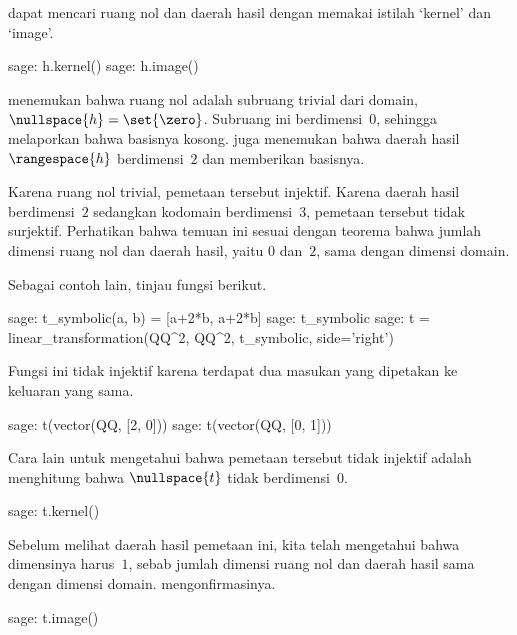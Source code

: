 \Sage{} dapat mencari ruang nol dan daerah hasil dengan memakai istilah
`kernel' dan `image'.
\begin{sagecommandline}
sage: h.kernel()                                       
sage: h.image()                                        
\end{sagecommandline}
\Sage{} menemukan bahwa ruang nol adalah subruang trivial dari domain,
$\nullspace{h}=\set{\zero}$.
Subruang ini berdimensi~$0$, sehingga \Sage{} melaporkan bahwa basisnya kosong.
\Sage{} juga menemukan bahwa daerah hasil $\rangespace{h}$ berdimensi~$2$
dan memberikan basisnya.

Karena ruang nol trivial, pemetaan tersebut injektif.
Karena daerah hasil berdimensi~$2$ sedangkan kodomain berdimensi~$3$,
pemetaan tersebut tidak surjektif.
Perhatikan bahwa temuan ini sesuai dengan teorema bahwa jumlah dimensi ruang
nol dan daerah hasil, yaitu $0$ dan~$2$, sama dengan dimensi domain.

Sebagai contoh lain, tinjau fungsi berikut.
\begin{sagecommandline}
sage: t_symbolic(a, b) = [a+2*b, a+2*b]
sage: t_symbolic
sage: t = linear_transformation(QQ^2, QQ^2, t_symbolic, side='right')
\end{sagecommandline}
Fungsi ini tidak injektif karena terdapat dua masukan yang dipetakan ke
keluaran yang sama.
\begin{sagecommandline}
sage: t(vector(QQ, [2, 0]))
sage: t(vector(QQ, [0, 1]))
\end{sagecommandline}
\noindent
Cara lain untuk mengetahui bahwa pemetaan tersebut tidak injektif adalah
menghitung bahwa $\nullspace{t}$ tidak berdimensi~$0$.
\begin{sagecommandline}
sage: t.kernel()
\end{sagecommandline}

Sebelum melihat daerah hasil pemetaan ini, kita telah mengetahui bahwa
dimensinya harus~$1$, sebab jumlah dimensi ruang nol dan daerah hasil sama
dengan dimensi domain.
\Sage{} mengonfirmasinya.
\begin{sagecommandline}
sage: t.image()
\end{sagecommandline}




